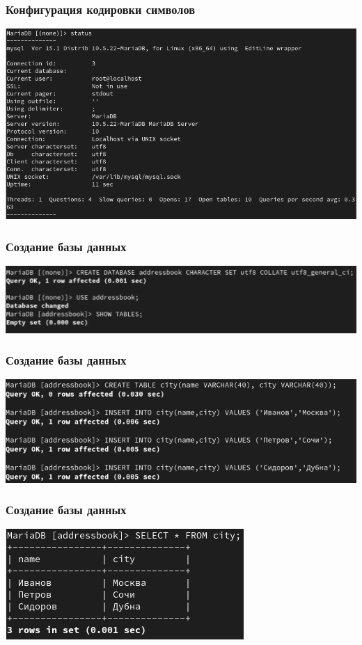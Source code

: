 \begin{frame}
\frametitle{Конфигурация кодировки символов}
    \centering
    \includegraphics[width=\textwidth]{../images/image10.png}
\end{frame}

\begin{frame}
\frametitle{Создание базы данных}
    \centering
    \includegraphics[width=\textwidth]{../images/image21.png}
\end{frame}

\begin{frame}
\frametitle{Создание базы данных}
    \centering
    \includegraphics[width=\textwidth]{../images/image11.png}
\end{frame}

\begin{frame}
\frametitle{Создание базы данных}
    \centering
    \includegraphics[width=\textwidth]{../images/image12.png}
\end{frame}


